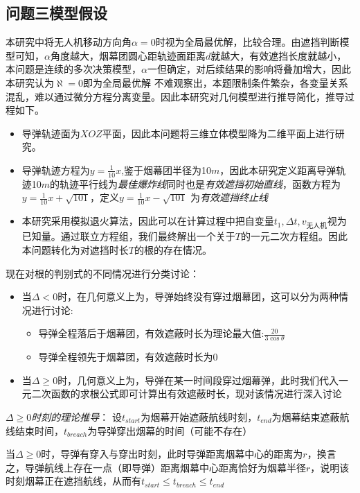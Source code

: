 \documentclass{article}
\begin{document}
\subsection{问题三模型假设}

本研究中将无人机移动方向角$\alpha = 0$时视为全局最优解，比较合理。由遮挡判断模型可知，$\alpha$角度越大，烟幕团圆心距轨迹面距离$d$就越大，有效遮挡长度就越小，本问题是连续的多次决策模型，$\alpha$一但确定，对后续结果的影响将叠加增大，因此本研究认为$\aleph = 0$即为全局最优解
不难观察出，本题限制条件繁杂，各变量关系混乱，难以通过微分方程分离变量。因此本研究对几何模型进行推导简化，推导过程如下。

\begin{itemize}
    \item 导弹轨迹面为$XOZ$平面，因此本问题将三维立体模型降为二维平面上进行研究。
    \item 导弹轨迹方程为$y = \frac{1}{10}x$,鉴于烟幕团半径为10$m$，因此本研究定义距离导弹轨迹10$m$的轨迹平行线为\textit{最佳爆炸线}同时也是\textit{有效遮挡初始直线}，函数方程为$y = \frac{1}{10}x + \sqrt{101}$，定义$y = \frac{1}{10}x - \sqrt{101}$
    为\textit{有效遮挡终止线}
    \item 本研究采用模拟退火算法，因此可以在计算过程中把自变量$t_1 , \Delta t , v_\text{无人机}$视为已知量。通过联立方程组，我们最终解出一个关于$T$的一元二次方程组。因此本问题转化为对遮挡时长$T$的根的存在情况。
\end{itemize}

现在对根的判别式的不同情况进行分类讨论：
\begin{itemize}
    \item 当$\Delta < 0$时，在几何意义上为，导弹始终没有穿过烟幕团，这可以分为两种情况进行讨论:\begin{itemize}
        \item 导弹全程落后于烟幕团，有效遮蔽时长为理论最大值:$\frac{20}{3\cos \theta}$
        \item 导弹全程领先于烟幕团，有效遮蔽时长为0
    \end{itemize}
    \item 当$\Delta \ge 0$时，几何意义上为，导弹在某一时间段穿过烟幕弹，此时我们代入一元二次函数的求根公式即可计算出有效遮蔽时长，现对该情况进行深入讨论
\end{itemize}

\textit{$\Delta \ge 0$时刻的理论推导}：
设$t_{start}$为烟幕开始遮蔽航线时刻，$t_{end}$为烟幕结束遮蔽航线结束时间，$t_{breach}$为导弹穿出烟幕的时间（可能不存在）

当$\Delta \ge 0$时，导弹有穿入与穿出时刻，此时导弹距离烟幕中心的距离为$r$，换言之，导弹航线上存在一点（即导弹）距离烟幕中心距离恰好为烟幕半径$r$，说明该时刻烟幕正在遮挡航线，从而有$t_{start} \le t_{breach} \le t_{end}$
\end{document}
